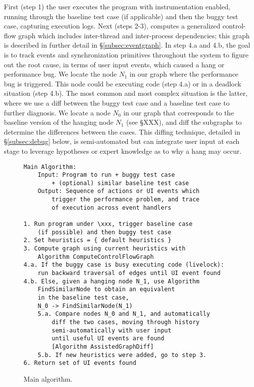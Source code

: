 First (step 1) the user executes the program with \xxx instrumentation enabled,
running through the baseline test case (if applicable) and then the buggy test
case, capturing execution logs. Next (steps 2-3), \xxx computes a generalized
control-flow graph which includes inter-thread and inter-process dependencies;
this graph is described in further detail in \S\ref{subsec:eventgraph}. In step
4.a and 4.b, the goal is to track events and synchronization primitives
throughout the system to figure out the root cause, in terms of user input
events, which caused a hang or performance bug. We locate the node $N_1$ in our
graph where the performance bug is triggered. This node could be executing code
(step 4.a) or in a deadlock situation (step 4.b). The most common and most
complex situation is the latter, where we use a diff between the buggy test
case and a baseline test case to further diagnosis. We locate a node $N_0$ in
our graph that corresponds to the baseline version of the hanging node $N_1$
(see \S XXX), and diff the subgraphs to determine the differences between the
cases. This diffing technique, detailed in \S\ref{subsec:debug} below, is
semi-automated but can integrate user input at each stage to leverage
hypotheses or expert knowledge as to why a hang may occur.

\begin{figure}[tb]
\footnotesize\begin{verbatim}
Main Algorithm:
    Input: Program to run + buggy test case
        + (optional) similar baseline test case
    Output: Sequence of actions or UI events which
        trigger the performance problem, and trace
        of execution across event handlers

1. Run program under \xxx, trigger baseline case
    (if possible) and then buggy test case
2. Set heuristics = { default heuristics }
3. Compute graph using current heuristics with
    Algorithm ComputeControlFlowGraph
4.a. If the buggy case is busy executing code (livelock):
    run backward traversal of edges until UI event found
4.b. Else, given a hanging node N_1, use Algorithm
    FindSimilarNode to obtain an equivalent
    in the baseline test case,
    N_0 -> FindSimilarNode(N_1)
    5.a. Compare nodes N_0 and N_1, and automatically
        diff the two cases, moving through history
        semi-automatically with user input
	    until useful UI events are found
        [Algorithm AssistedGraphDiff]
    5.b. If new heuristics were added, go to step 3.
6. Return set of UI events found
\end{verbatim}
    \caption{Main \xxx algorithm.}
    \label{fig:alg-main}
\end{figure}


